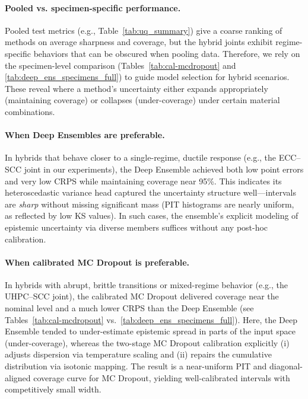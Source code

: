 \documentclass{article}
\begin{document}
\paragraph{Pooled vs. specimen-specific performance.} Pooled test metrics (e.g., Table~\ref{tab:uq_summary}) give a coarse ranking of methods on average sharpness and coverage, but the hybrid joints exhibit regime-specific behaviors that can be obscured when pooling data. Therefore, we rely on the specimen-level comparison (Tables~\ref{tab:cal-mcdropout} and \ref{tab:deep_ens_specimens_full}) to guide model selection for hybrid scenarios. These reveal where a method’s uncertainty either expands appropriately (maintaining coverage) or collapses (under-coverage) under certain material combinations.

\paragraph{When Deep Ensembles are preferable.} In hybrids that behave closer to a single-regime, ductile response (e.g., the ECC–SCC joint in our experiments), the Deep Ensemble achieved both low point errors and very low CRPS while maintaining coverage near 95\%. This indicates its heteroscedastic variance head captured the uncertainty structure well—intervals are \emph{sharp} without missing significant mass (PIT histograms are nearly uniform, as reflected by low KS values). In such cases, the ensemble’s explicit modeling of epistemic uncertainty via diverse members suffices without any post-hoc calibration.


\paragraph{When calibrated MC Dropout is preferable.} In hybrids with abrupt, brittle transitions or mixed-regime behavior (e.g., the UHPC–SCC joint), the calibrated MC Dropout delivered coverage near the nominal level and a much lower CRPS than the Deep Ensemble (see Tables~\ref{tab:cal-mcdropout} vs.~\ref{tab:deep_ens_specimens_full}). Here, the Deep Ensemble tended to under-estimate epistemic spread in parts of the input space (under-coverage), whereas the two-stage MC Dropout calibration explicitly (i) adjusts dispersion via temperature scaling and (ii) repairs the cumulative distribution via isotonic mapping. The result is a near-uniform PIT and diagonal-aligned coverage curve for MC Dropout, yielding well-calibrated intervals with competitively small width.
\end{document}
